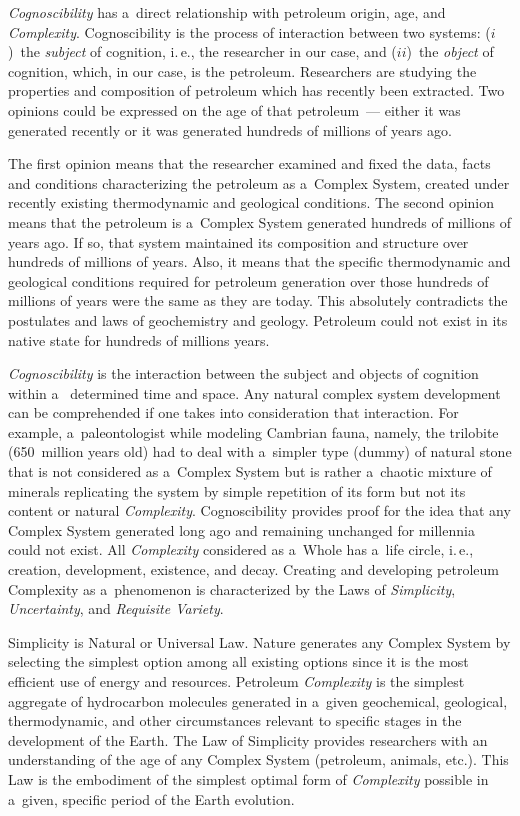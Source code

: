 \begin{multicols}{2}
\textit{Cognoscibility} has a~direct relationship with petroleum origin, age, and 
\textit{Complexity}. Cognoscibility is the process of interaction between two systems: ($i$)~the 
\textit{subject} of cognition, i.\,e., the researcher in our case, and ($ii$)~the \textit{object} of 
cognition, which, in our case, is the petroleum. Researchers are studying the properties and 
composition of petroleum which has recently been extracted. Two opinions could be expressed 
on the age of that petroleum~--- either it was generated recently or it was generated hundreds of 
millions of years ago. 

The first opinion means that the researcher examined and fixed the data, facts and conditions 
characterizing the petroleum as a~Complex System, created under recently existing thermodynamic 
and geological conditions. The second opinion means that the petroleum is a~Complex System 
generated hundreds of millions of years ago. If so, that system maintained its composition and 
structure over hundreds of millions of years. Also, it means that the specific thermodynamic and 
geological conditions required for petroleum generation over those hundreds of millions of years 
were the same as they are today. This absolutely contradicts the postulates and laws of 
geochemistry and geology. Petroleum could not exist in its native state for hundreds of millions 
years.

\textit{Cognoscibility} is the interaction between the subject and objects of cognition within a~
determined time and space. Any natural complex system development can be comprehended if 
one takes into consideration that interaction. For example, a~paleontologist while modeling 
Cambrian fauna, namely, the trilobite (650~million years old) had to deal with a~simpler type 
(dummy) of natural stone that is not considered as a~Complex System but is rather a~chaotic mixture 
of minerals replicating the system by simple repetition of its form but not its content or natural 
\textit{Complexity}. Cognoscibility provides proof for the idea that any Complex System 
generated long ago and remaining unchanged for millennia could not exist. All 
\textit{Complexity} considered as a~Whole has a~life circle, i.\,e., creation, development, existence, 
and decay.
Creating and developing petroleum Complexity as a~phenomenon is characterized by the Laws of 
\textit{Simplicity}, \textit{Uncertainty}, and \textit{Requisite Variety}.

Simplicity is Natural or Universal Law. Nature generates any Complex System by selecting the 
simplest option among all existing options since it is the most efficient use of energy and 
resources. Petroleum \textit{Complexity} is the simplest aggregate of hydrocarbon molecules 
generated in a~given geochemical, geological, thermodynamic, and other circumstances 
relevant to specific stages in the development of the Earth. The Law of Simplicity provides 
researchers with an understanding of the age of any Complex System (petroleum, animals,  
etc.). This Law is the embodiment of the simplest optimal form of \textit{Complexity} possible 
in a~given, specific period of the Earth evolution.


\end{multicols}
